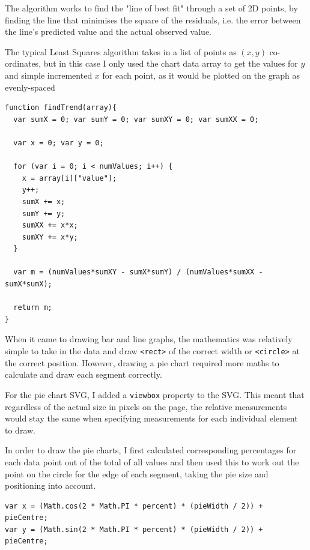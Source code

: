 \documentclass[ %
                    author={Aleena Baig},
                supervisor={Dr Simon Lock},
                    degree={BSc},
                     title={On Making Web Accessible Graphs},
                  subtitle={},
                      year={2019} ]{dissertation}
\begin{document}
The algorithm works to find the "line of best fit" through a set of 2D points, by finding the line that minimises the square of the residuals, i.e. the error between the line's predicted value and the actual observed value.

The typical Least Squares algorithm takes in a list of points as $(x,y)$ co-ordinates, but in this case I only used the chart data array to get the values for $y$ and simple incremented $x$ for each point, as it would be plotted on the graph as evenly-spaced

\begin{lstlisting}
function findTrend(array){
  var sumX = 0; var sumY = 0; var sumXY = 0; var sumXX = 0;

  var x = 0; var y = 0; 

  for (var i = 0; i < numValues; i++) {
    x = array[i]["value"];
    y++;
    sumX += x;
    sumY += y;
    sumXX += x*x;
    sumXY += x*y;
  }

  var m = (numValues*sumXY - sumX*sumY) / (numValues*sumXX - sumX*sumX);

  return m;
}
\end{lstlisting}

When it came to drawing bar and line graphs, the mathematics was relatively simple to take in the data and draw \texttt{<rect>} of the correct width or \texttt{<circle>} at the correct position. However, drawing a pie chart required more maths to calculate and draw each segment correctly.

For the pie chart SVG, I added a \texttt{viewbox} property to the SVG. This meant that regardless of the actual size in pixels on the page, the relative measurements would stay the same when specifying measurements for each individual element to draw.

In order to draw the pie charts, I first calculated corresponding percentages for each data point out of the total of all values and then used this to work out the point on the circle for the edge of each segment, taking the pie size and positioning into account.

\begin{lstlisting}
var x = (Math.cos(2 * Math.PI * percent) * (pieWidth / 2)) + pieCentre;
var y = (Math.sin(2 * Math.PI * percent) * (pieWidth / 2)) + pieCentre;
\end{lstlisting}
\end{document}
